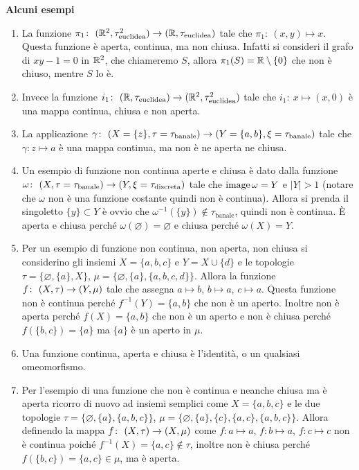 \textbf{Alcuni esempi}
\begin{enumerate}
	\item La funzione $\pi_1 \colon\ (\mathbb{R}^2,\tau^2_{\text{euclidea}}) \rightarrow (\mathbb{R},\tau_{\text{euclidea}})$ tale che $\pi_1 \colon\ (x,y) \mapsto x$. Questa funzione è aperta, continua, ma non chiusa. Infatti si consideri il grafo di $xy - 1 = 0$ in $\mathbb{R}^2$, che chiameremo $S$, allora $\pi_1(S) = \mathbb{R} \setminus \{0\}$ che non è chiuso, mentre $S$ lo è.
	\item Invece la funzione $i_1 \colon\ (\mathbb{R},\tau_{\text{euclidea}}) \rightarrow (\mathbb{R}^2,\tau^2_{\text{euclidea}})$ tale che $i_1 \colon\ x \mapsto (x,0)$ è una mappa continua, chiusa e non aperta. %
	\item La applicazione $\gamma \colon\ (X = \{z\},\tau =\tau_{\text{banale}}) \rightarrow (Y = \{a,b\},\xi = \tau_{\text{banale}})$ tale che  $\gamma \colon z \mapsto a$ è una mappa continua, ma non è ne aperta ne chiusa.
	\item Un esempio di funzione non continua aperte e chiusa è dato dalla funzione $\omega \colon\ (X,\tau =\tau_{\text{banale}}) \rightarrow (Y,\xi = \tau_{\text{discreta}})$ tale che $\operatorname{image}{\omega} = Y$ e $|Y| > 1$ (notare che $\omega$ non è una funzione costante quindi non è continua). Allora si prenda il singoletto $\{y\} \subset Y$ è ovvio che $\omega^{-1}(\{y\}) \notin \tau_{\text{banale}}$, quindi non è continua. È aperta e chiusa perché $\omega(\varnothing) = \varnothing$ e chiusa perché $\omega(X) = Y$.
	\item Per un esempio di funzione non continua, non aperta, non chiusa si considerino gli insiemi $X = \{a,b,c\}$ e $Y = X \cup \{d\}$ e le topologie $\tau = \{\varnothing, \{a\}, X\}$, $\mu = \{ \varnothing, \{a\}, \{a,b,c,d\}\}$. Allora la funzione $f \colon\ (X,\tau) \rightarrow (Y,\mu)$ tale che assegna $a \mapsto b$, $b \mapsto a$, $c \mapsto a$. Questa funzione non è continua perché $f^{-1}(Y) = \{a,b\}$ che non è un aperto. Inoltre non è aperta perché $f(X) = \{a,b\}$ che non è un aperto e non è chiusa perché $f(\{b,c\}) = \{a\}$ ma $\{a\}$ è un aperto in $\mu$.
	\item Una funzione continua, aperta e chiusa è l'identità, o un qualsiasi omeomorfismo.
	\item Per l'esempio di una funzione che non è continua e neanche chiusa ma è aperta ricorro di nuovo ad insiemi semplici come $X = \{a,b,c\}$ e le due topologie $\tau = \{\varnothing, \{a\},\{a,b,c\}\}$, $\mu = \{\varnothing, \{a\}, \{c\}, \{a,c\}, \{a,b,c\}\}$. Allora definendo la mappa $f \colon\ (X,\tau) \rightarrow (X,\mu)$ come $f \colon a \mapsto a$, $f \colon b \mapsto a$, $f \colon c \mapsto c$ non è continua poiché $f^{-1}(X) = \{a,c\} \notin \tau$, inoltre non è chiusa perché $f(\{b,c\}) = \{a,c\} \in \mu$, ma è aperta.\\

\end{enumerate}
